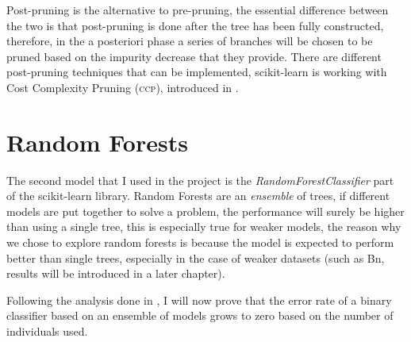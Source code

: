 \medskip

Post-pruning is the alternative to pre-pruning, the essential difference between the two is that
post-pruning is done after the tree has been fully constructed, therefore, in the a posteriori phase
a series of branches will be chosen to be pruned based on the impurity decrease that they provide.
There are different post-pruning techniques that can be implemented, scikit-learn is working with
Cost Complexity Pruning (\textsc{ccp}), introduced in \cite{breiman1984classification}.

\section{Random Forests}
\label{sec:rf}


The second model that I used in the project is the \emph{RandomForestClassifier} part of the scikit-learn
library. Random Forests are an \emph{ensemble} of trees, if different models are put together to solve a
problem, the performance will surely be higher than using a single tree, this is especially true for
weaker models, the reason why we chose to explore random forests is because the model is expected to
perform better than single trees, especially in the case of weaker datasets (such as Bn, results
will be introduced in a later chapter).

\medskip

Following the analysis done in \cite{ZhouZhi-Hua2021ML}, I will now prove that the error rate of a
binary classifier based on an ensemble of models grows to zero based on the number of individuals
used.

